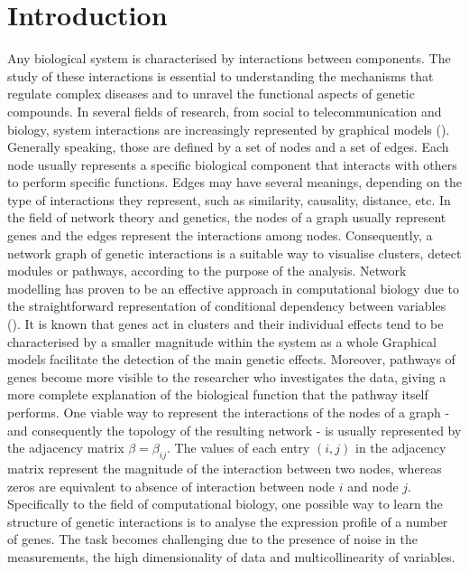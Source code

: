 \section{Introduction}
Any biological system is characterised by interactions between components. The study of these interactions is essential to understanding the mechanisms that regulate complex diseases and to unravel the functional aspects of genetic compounds. 
In several fields of research, from social to telecommunication and biology, system interactions are increasingly represented by graphical models (\citealp{Vidal2011Complex, BAR03a, wisdomcrowds}). Generally speaking, those are defined by a set of nodes and a set of edges. Each node usually represents a specific biological component that interacts with others to perform specific functions. Edges may have several meanings, depending on the type of interactions they represent, such as similarity, causality, distance, etc. 
In the field of network theory and genetics, the nodes of a graph usually represent genes and the edges represent the interactions among nodes. Consequently, a network graph of genetic interactions is a suitable way to visualise clusters, detect modules or pathways, according to the purpose of the analysis.
Network modelling has proven to be an effective approach in computational biology due to the straightforward representation of conditional dependency between variables (\citealp{netmedicine1, netmedicine2}).
It is known that genes act in clusters and their individual effects tend to be characterised by a smaller magnitude within the system as a whole \citealp{Michalak2008243, YiST07} Graphical models facilitate the detection of the main genetic effects. Moreover, pathways of genes become more visible to the researcher who investigates the data, giving a more complete explanation of the biological function that the pathway itself performs.
One viable way to represent the interactions of the nodes of a graph - and consequently the  topology of the resulting network - is usually represented by the adjacency matrix $\beta = \beta_{ij}$. The values of each entry $(i,j)$ in the adjacency matrix represent the magnitude of the interaction between two nodes, whereas zeros are equivalent to absence of interaction between node $i$ and node $j$. 
Specifically to the field of computational biology, one possible way to learn the structure of genetic interactions is to analyse the expression profile of a number of genes. The task becomes challenging due to the presence of noise in the measurements, the high dimensionality of data and multicollinearity of variables. 
